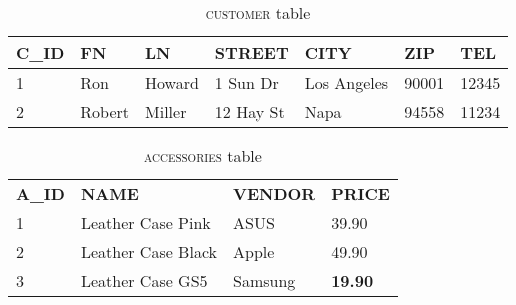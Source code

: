 \documentclass{vldb}
\begin{document}

\begin{table*}[h]

\begin{tabular}{@{}lllllll@{}}
\toprule
\rowcolor[HTML]{C0C0C0} 
\textbf{C\_ID} & \textbf{FN}     & \textbf{LN}     & \textbf{STREET}    & \textbf{CITY}        & \textbf{ZIP}   & \textbf{TEL}   \\ \midrule
1     & Ron    & Howard & 1 Sun Dr  & Los Angeles & 90001 & 12345 \\
2     & Robert & Miller & 12 Hay St & Napa        & 94558 & 11234 \\ \bottomrule
\end{tabular}
\caption{\textsc{customer} table}
\end{table*}

\begin{table*}[h]

\begin{tabular}{@{}llll@{}}
\rowcolor[HTML]{C0C0C0} 
\textbf{A\_ID} & \textbf{NAME}      & \textbf{VENDOR} & \textbf{PRICE} \\
1              & Leather Case Pink  & ASUS            & 39.90          \\
2              & Leather Case Black & Apple           & 49.90          \\
3              & Leather Case GS5   & Samsung         & \textbf{19.90}
\end{tabular}
\caption{\textsc{accessories} table}
\label{my-label}
\end{table*}
\end{document}
